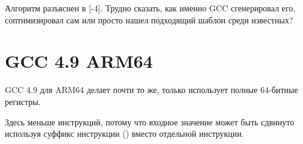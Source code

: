 Алгоритм разъяснен в [-4].
Трудно сказать, как именно GCC сгенерировал его, соптимизировал сам или просто нашел подходящий шаблон среди известных?%

\section{\Optimizing GCC 4.9 ARM64}

GCC 4.9 для ARM64 делает почти то же, только использует полные 64-битные регистры.

Здесь меньше инструкций, потому что входное значение может быть сдвинуто используя суффикс инструкции ()
вместо отдельной инструкции.



